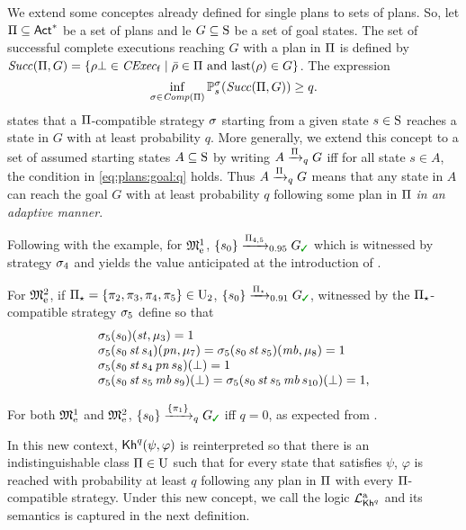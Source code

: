 We extend some conceptes already defined for single plans to sets of
plans.  So, let $\plans\subseteq\Act^*$ be a set of plans and le
$G\subseteq\S$ be a set of goal states.  The set of successful
complete executions reaching $G$ with a plan in $\plans$ is defined
by
$\Succ(\plans,G)=\{{\rho\complete\in\cexecf}\mid{\bar{\rho}\in\plans \text{ and } \last(\rho)\in G}\}$.
%
The expression
%
\begin{equation}\label{eq:plans:goal:q}
  \inf_{\strat \in\Comp(\plans)}\Prob^\strat_s(\Succ(\plans,G)) \geq q.
\end{equation}
%
states that a $\plans$-compatible strategy $\strat$
starting from a given state $s\in\S$ reaches a state in $G$ with at
least probability $q$.
%
More generally, we extend this concept to a set of assumed starting
states $A\subseteq\S$ by writing $A \reach{\plans}_q G$ iff for all
state $s\in A$, the condition in \cref{eq:plans:goal:q} holds.
%
Thus $A \reach{\plans}_q G$ means that any state in $A$ can reach the
goal $G$ with at least probability $q$ following some plan in $\plans$
\emph{in an adaptive manner}.

\begin{example}\label{ex:running:plans-exec}
  Following with the example, for $\modelex^1$,
  $\{s_0\}\reach{\plans_{4,5}}_{0.95}G_{\goal}$ which is witnessed by
  strategy $\strat_4$ and yields the value anticipated at the
  introduction of .

  For $\modelex^2$, if
  $\plans_{\star}=\{\plan_2,\plan_3,\plan_4,\plan_5\}\in\Unc_2$,
  $\{s_0\}\reach{\plans_{\star}}_{0.91}G_{\goal}$, witnessed by the
  $\plans_{\star}$-compatible strategy $\strat_5$ define so that
  \[
  \begin{array}{l}
    \strat_5(s_0)(\stairs,\mu_3)=1\\
    \strat_5(s_0\,\stairs\,s_4)(\panic,\mu_7)=\strat_5(s_0\,\stairs\,s_5)(\mobile,\mu_8)=1\\
    \strat_5(s_0\,\stairs\,s_4\,\panic\,s_8)(\complete)=1\\
    \strat_5(s_0\,\stairs\,s_5\,\mobile\,s_9)(\complete)=
    \strat_5(s_0\,\stairs\,s_5\,\mobile\,s_{10})(\complete)=1,
  \end{array}
  \]
  
  For both $\modelex^1$ and $\modelex^2$,
  $\{s_0\}\reach{\{\plan_1\}}_qG_{\goal}$ iff $q=0$, as expected from
  .
\end{example}

In this new context, $\kh^q(\psi,\varphi)$ is reinterpreted so that
there is an indistinguishable class $\plans\in\Unc$ such that for
every state that satisfies $\psi$, $\varphi$ is reached with
probability at least $q$ following any plan in $\plans$ with every
$\plans$-compatible strategy.
%
Under this new concept, we call the logic $\PKhadapt$ and its
semantics is captured in the next definition.

